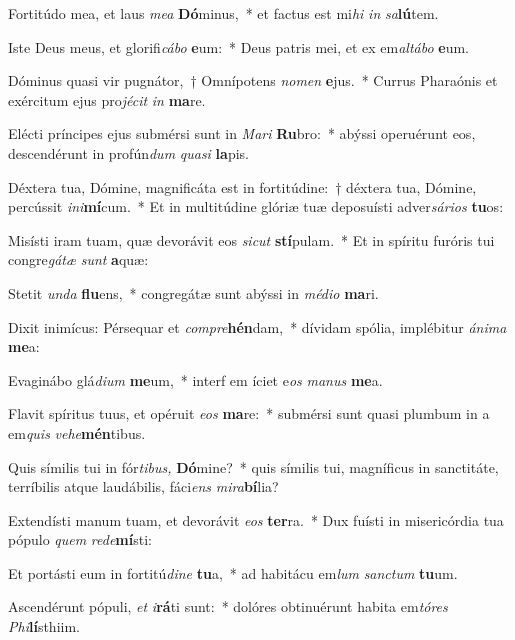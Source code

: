 \item Fortitúdo mea, et laus \textit{mea} \textbf{Dó}minus,~* et factus est mi\textit{hi} \textit{in} \textit{sa}\textbf{lú}tem.
\item Iste Deus meus, et glorifi\textit{cábo} \textbf{e}um:~* Deus patris mei, et ex em\textit{altábo} \textbf{e}um.
\item Dóminus quasi vir pugnátor,~† Omnípotens \textit{nomen} \textbf{e}jus.~* Currus Pharaónis et exércitum ejus pro\textit{jécit} \textit{in} \textbf{ma}re.
\item Elécti príncipes ejus submérsi sunt in \textit{Mari} \textbf{Ru}bro:~* abýssi operuérunt eos, descendérunt in profún\textit{dum} \textit{quasi} \textbf{la}pis.
\item Déxtera tua, Dómine, magnificáta est in fortitúdine:~† déxtera tua, Dómine, percússit \textit{ini}\hspace{-0.01em}\textbf{mí}cum.~* Et in multitúdine glóriæ tuæ deposuísti adver\textit{sários} \textbf{tu}os:
\item Misísti iram tuam, quæ devorávit eos \textit{sic\-ut} \textbf{stí}pulam.~* Et in spíritu furóris tui congre\textit{gátæ} \textit{sunt} \textbf{a}quæ:
\item Stetit \textit{unda} \textbf{flu}ens,~* congregátæ sunt abýssi in \textit{médio} \textbf{ma}ri.
\item Dixit inimícus: Pérsequar et \textit{compre}\textbf{hén}dam,~* dívidam spólia, implébitur \textit{ánima} \textbf{me}a:
\item Evaginábo glá\tinyhspace\textit{dium} \textbf{me}um,~* interf em íciet e\textit{os} \textit{manus} \textbf{me}a.
\item Flavit spíritus tuus, et opéruit \textit{eos} \textbf{ma}re:~* submérsi sunt quasi plumbum in a em\textit{quis} \textit{vehe}\textbf{mén}tibus.
\item Quis símilis tui in fór\textit{tibus,} \textbf{Dó}mine?~* quis símilis tui, magníficus in sanctitáte, terríbilis atque laudábilis, fáci\textit{ens} \textit{mira}\textbf{bí}lia?
\item Extendísti manum tuam, et devorávit \textit{eos} \textbf{ter}ra.~* Dux fuísti in misericórdia tua pópulo \textit{quem} \textit{rede}\textbf{mí}sti:
\item Et portásti eum in fortitú\textit{dine} \textbf{tu}a,~* ad habitácu em\textit{lum} \textit{sanctum} \textbf{tu}um.
\item Ascendérunt pópuli, \textit{et} \textit{i}\textbf{rá}ti sunt:~* dolóres obtinuérunt habita em\textit{tóres} \textit{Phi}\textbf{lí}sthiim.
